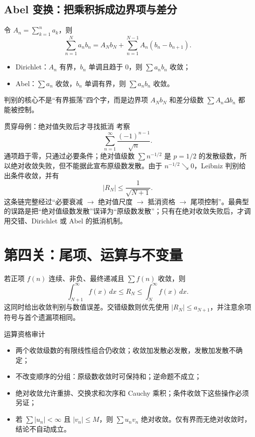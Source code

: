 \documentclass[11pt,a4paper,fontset=fandol]{ctexart}
\begin{document}
\subsection{Abel 变换：把乘积拆成边界项与差分}
令 $A_n=\sum_{k=1}^{n}a_k$，则
\[
\sum_{n=1}^{N}a_nb_n=A_Nb_N+\sum_{n=1}^{N-1}A_n(b_n-b_{n+1}).
\]
\begin{itemize}
  \item Dirichlet：$A_n$ 有界，$b_n$ 单调且趋于 $0$，则 $\sum a_nb_n$ 收敛；
  \item Abel：$\sum a_n$ 收敛，$b_n$ 单调有界，则 $\sum a_nb_n$ 收敛。
\end{itemize}
判别的核心不是“有界振荡”四个字，而是边界项 $A_Nb_N$ 和差分级数 $\sum A_n\Delta b_n$ 都能被控制。

\begin{examplebox}{贯穿母例：绝对值失败后才寻找抵消}
考察
\[
\sum_{n=1}^{\infty}\frac{(-1)^{n-1}}{\sqrt n}.
\]
通项趋于零，只通过必要条件；绝对值级数 $\sum n^{-1/2}$ 是 $p=1/2$ 的发散级数，所以绝对收敛失败，但不能据此宣布原级数发散。由于 $n^{-1/2}\searrow0$，Leibniz 判别给出条件收敛，并有
\[
\lvert R_N\rvert\le\frac1{\sqrt{N+1}}.
\]
这条链完整经过“必要衰减 $\to$ 绝对值尺度 $\to$ 抵消资格 $\to$ 尾项控制”。最典型的误路是把“绝对值级数发散”误译为“原级数发散”；只有在绝对收敛失败后，才调用交错、Dirichlet 或 Abel 的抵消机制。
\end{examplebox}

\section{第四关：尾项、运算与不变量}
若正项 $f(n)$ 连续、非负、最终递减且 $\sum f(n)$ 收敛，则
\[
\int_{N+1}^{\infty}f(x)\,dx\le R_N\le\int_N^{\infty}f(x)\,dx.
\]
这同时给出收敛判别与数值误差。交错级数则优先使用 $\lvert R_N\rvert\le a_{N+1}$，并注意余项符号与首个遗漏项相同。

\begin{methodbox}{运算资格审计}
\begin{itemize}
  \item 两个收敛级数的有限线性组合仍收敛；收敛加发散必发散，发散加发散不确定；
  \item 不改变顺序的分组：原级数收敛时可保持和；逆命题不成立；
  \item 绝对收敛允许重排、交换求和次序和 Cauchy 乘积；条件收敛下这些操作必须另证；
  \item 若 $\sum\lvert u_n\rvert<\infty$ 且 $\lvert v_n\rvert\le M$，则 $\sum u_nv_n$ 绝对收敛。仅有界而无绝对收敛时，结论不自动成立。
\end{itemize}
\end{methodbox}
\end{document}
